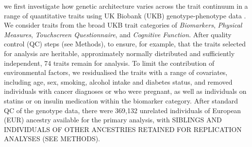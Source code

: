 \documentclass[12pt]{zHenriquesLab-StyleBioRxiv}
\begin{document}
{%
% 
% 
% 
% 
% 
% 
% 
% 
% 
% 
% 
% 
% 
%
% 
% 
% 
% 
% 
% 
% 
% 
% 
% 
% 
% 
% 
% 
% 
% 
% 
% 
% 
{ we first investigate how genetic architecture 
varies across the trait continuum in a range of 
quantitative traits using UK Biobank (UKB) 
genotype-phenotype data \cite{Bycroft2018}. We consider traits 
from the broad UKB trait categories of \emph{Biomarkers}, 
\emph{Physical Measures}, \emph{Touchscreen Questionnaire}, and \emph{Cognitive Function}. 
After quality control (QC) steps (see Methods), to ensure, for example, 
that the traits selected for analysis are heritable, approximately normally distributed and 
sufficiently independent, 74 traits remain for analysis. 
To limit the contribution of environmental factors, we 
residualised the traits with a range of covariates, including 
age, sex, smoking, alcohol intake and diabetes status, and 
removed individuals with cancer diagnoses or who 
were pregnant, as well as individuals on statins or on 
insulin medication within the biomarker category. 
After standard QC of the genotype data,
there were 369,132 unrelated individuals of European (EUR)
ancestry available for the primary analysis, with SIBLINGS AND 
INDIVIDUALS OF OTHER ANCESTRIES RETAINED FOR 
REPLICATION ANALYSES (SEE METHODS). 

}}
\end{document}
